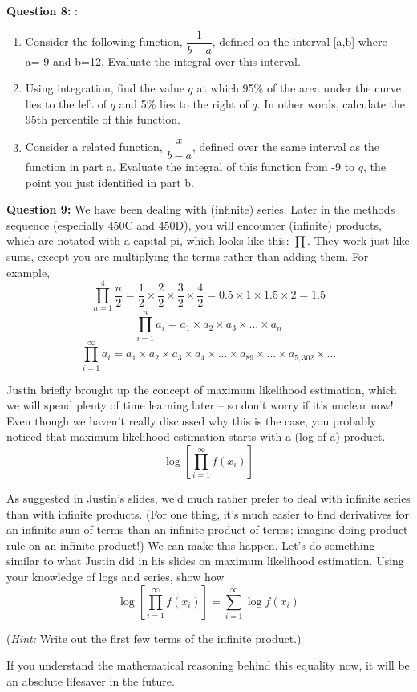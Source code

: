 \documentclass[12pt]{article}
\begin{document}
\bigskip


\noindent \textbf{Question 8:} :\\

\begin{enumerate}
	\item Consider the following function, $\dfrac{1}{b-a}$, defined on the interval [a,b] where a=-9 and b=12. Evaluate the integral over this interval. 
	
	\item Using integration, find the value $q$ at which 95\% of the area under the curve lies to the left of $q$ and 5\% lies to the right of $q$. In other words, calculate the 95th percentile of this function.
	
	\item Consider a related function, $\dfrac{x}{b-a}$, defined over the same interval as the function in part a. Evaluate the integral of this function from -9 to $q$, the point you just identified in part b. 
\end{enumerate}


\bigskip

\textbf{Question 9:} We have been dealing with (infinite) series. Later in the methods sequence (especially 450C and 450D), you will encounter (infinite) products, which are notated with a capital pi, which looks like this: $\prod$. They work just like sums, except you are multiplying the terms rather than adding them. For example, 
$$\prod_{n=1}^4 \frac{n}{2} = \frac{1}{2} \times \frac{2}{2} \times \frac{3}{2} \times \frac{4}{2} = 0.5 \times 1 \times 1.5 \times 2 = 1.5$$
$$\prod_{i=1}^n a_i = a_1 \times a_2 \times a_3 \times ... \times a_n$$
$$\prod_{i=1}^\infty a_i = a_1 \times a_2 \times a_3 \times a_4 \times ... \times a_{89} \times ... \times a_{5,302} \times ... $$

Justin briefly brought up the concept of maximum likelihood estimation, which we will spend plenty of time learning later -- so don't worry if it's unclear now! Even though we haven't really discussed why this is the case, you probably noticed that maximum likelihood estimation starts with a (log of a) product.
$$\log \left[\prod_{i=1}^{\infty} f(x_i)\right]$$

As suggested in Justin's slides, we'd much rather prefer to deal with infinite series than with infinite products. (For one thing, it's much easier to find derivatives for an infinite sum of terms than an infinite product of terms; imagine doing product rule on an infinite product!) We can make this happen. Let's do something similar to what Justin did in his slides on maximum likelihood estimation. Using your knowledge of logs and series, show how
\medskip
\begin{equation*}
\log \left[\prod_{i=1}^{\infty} f(x_i)\right] = \sum_{i=1}^\infty \log f(x_i)
\end{equation*}

({\it Hint:} Write out the first few terms of the infinite product.)

If you understand the mathematical reasoning behind this equality now, it will be an absolute lifesaver in the future.
\end{document}
